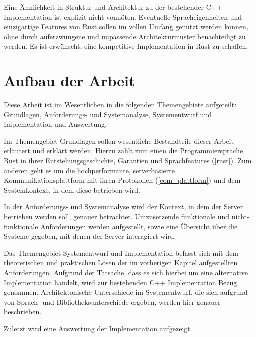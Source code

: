 Eine Ähnlichkeit in Struktur und Architektur zu der bestehender C++ Implementation ist explizit nicht vonnöten.
Eventuelle Spracheigenheiten und einzigartige Features von Rust sollen im vollen Umfang genutzt werden können, ohne durch auferzwungene und unpassende Architekturmuster benachteiligt zu werden.
Es ist erwünscht, eine kompetitive Implementation in Rust zu schaffen.


\section{Aufbau der Arbeit}

Diese Arbeit ist im Wesentlichen in die folgenden Themengebiete aufgeteilt: Grundlagen, Anforderungs- und Systemanalyse, Systementwurf und Implementation und Auswertung.

Im Themengebiet Grundlagen sollen wesentliche Bestandteile dieser Arbeit erläutert und erklärt werden.
Hierzu zählt zum einen die Programmiersprache Rust in ihrer Entstehungsgeschichte, Garantien  und Sprachfeatures  (\autoref{rust}).
Zum anderen geht es um die hochperformante, serverbasierte Kommunikationsplattform mit ihren Protokollen (\autoref{com_plattform}) und dem Systemkontext, in dem diese betrieben wird.

In der Anforderungs- und Systemanalyse wird der Kontext, in dem der Server betrieben werden soll, genauer betrachtet. Umzusetzende funktionale und nicht-funktionale Anforderungen werden aufgestellt, sowie eine Übersicht über die Systeme gegeben, mit denen der Server interagiert wird.

Das Themengebiet Systementwurf und Implementation befasst sich mit dem theoretischen und praktischen Lösen der im vorherigen Kapitel aufgestellten Anforderungen. Aufgrund der Tatsache, dass es sich hierbei
um eine alternative Implementation handelt, wird zur bestehenden C++ Implementation Bezug genommen.
Architektonische Unterschiede im Systementwurf, die sich aufgrund von Sprach- und Bibliotheksunterschiede ergeben, werden hier genauer beschrieben.

Zuletzt wird eine Auswertung der Implementation aufgezeigt.

